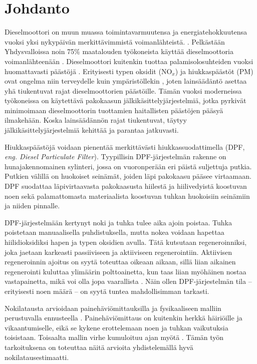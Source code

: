 \chapter{Johdanto}%
\label{ch:johdanto}
Dieselmoottori on muun muassa toimintavarmuutensa ja energiatehokkuutensa vuoksi yksi nykypäivän merkittävimmistä voimanlähteistä.  
\cite[s. 121, 137-138]{Koten_2024}.
Pelkästään Yhdysvalloissa noin 75\% maatalouden työkoneista käyttää dieselmoottoria voimanlähteenään \cite[s. 122]{Koten_2024}.  
Dieselmoottori kuitenkin tuottaa palamisolosuhteiden vuoksi
huomattavasti päästöjä \cite{FiebigMichael2014Pefd}. Erityisesti typen oksidit (NO\(_x\)) ja hiukkaspäästöt (PM) ovat ongelma niin terveydelle kuin ympäristöllekin \cite{YaoDongwei2023Rodm}\cite[s. 138]{Koten_2024}, joten  lainsäädäntö asettaa yhä tiukentuvat rajat dieselmoottorien päästöille. Tämän vuoksi moderneissa työkoneissa on käytettävä pakokaasun jälkikäsittelyjärjestelmiä, jotka pyrkivät minimoimaan dieselmoottorin tuottamien haitallisten päästöjen pääsyä ilmakehään. Koska lainsäädännön rajat tiukentuvat, täytyy jälkikäsittelyjärjestelmiä kehittää ja parantaa jatkuvasti.

Hiukkaspäästöjä voidaan pienentää merkittävästi hiukkassuodattimella (DPF, \emph{eng. Diesel Particulate Filter}).
Tyypillisin \cite{SHIYunxi2020Eota} DPF-järjestelmän rakenne on hunajakennomainen sylinteri, jossa on vuoronperään eri päistä suljettuja putkia. Putkien välillä on huokoiset seinämät, joiden läpi pakokaasu pääsee virtaamaan.
DPF suodattaa läpivirtaavasta pakokaasusta hiilestä ja hiilivedyistä koostuvan noen sekä palamattomasta materiaalista koostuvan tuhkan huokoisiin seinämiin ja niiden pinnalle. 

DPF-järjestelmään kertynyt noki ja tuhka tulee aika ajoin poistaa. Tuhka poistetaan manuaalisella puhdistuksella, mutta nokea voidaan hapettaa hiilidioksidiksi hapen ja typen oksidien avulla. Tätä kutsutaan regeneroinniksi, joka jaetaan karkeasti passiiviseen ja aktiiviseen regenerointiin.
Aktiivisen regeneroinnin ajoitus on syytä toteuttaa oikeaan aikaan, sillä liian aikainen regenerointi kuluttaa ylimäärin polttoainetta, kun taas liian myöhäinen nostaa vastapainetta, mikä voi olla jopa vaarallista \cite{YaoDongwei2023Rodm}. 
Näin ollen DPF-järjestelmän tila -- erityisesti noen määrä -- on syytä tuntea mahdollisimman tarkasti. 

Nokilatausta arvioidaan painehäviömittauksilla ja fysikaaliseen malliin perustuvalla ennusteella \cite{YaoDongwei2023Rodm}. Painehäviömittaus on kuitenkin herkkä häiriöille ja vikaantumiselle, eikä se kykene erottelemaan noen ja tuhkan vaikutuksia toisistaan.
Toisaalta mallin virhe kumuloituu ajan myötä \cite{YaoDongwei2023Rodm}.
Tämän työn tarkoituksena on toteuttaa näitä arvioita yhdistelemällä hyvä nokilatausestimaatti. 

